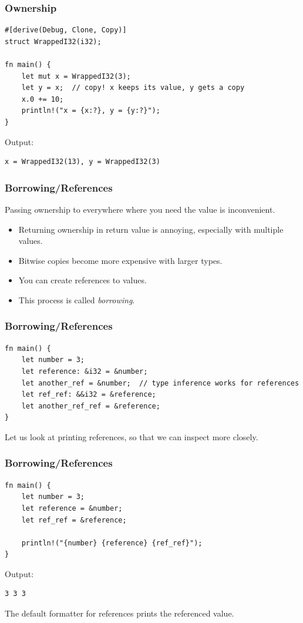 \begin{frame}[fragile]
    \frametitle{Ownership}
    \begin{verbatim}
#[derive(Debug, Clone, Copy)]
struct WrappedI32(i32);

fn main() {
    let mut x = WrappedI32(3);
    let y = x;  // copy! x keeps its value, y gets a copy
    x.0 += 10;
    println!("x = {x:?}, y = {y:?}");
}
    \end{verbatim}
    \pause
    \vfill
    Output:
    \begin{verbatim}
x = WrappedI32(13), y = WrappedI32(3)
    \end{verbatim}
\end{frame}

\begin{frame}[fragile]
    \frametitle{Borrowing/References}
    Passing ownership to everywhere where you need the value is inconvenient.
    \pause
    \begin{itemize}
        \item Returning ownership in return value is annoying, especially with multiple values.
        \item Bitwise copies become more expensive with larger types.
        \pause
        \vspace{.3cm}
        \item You can create references to values.
        \item This process is called \textit{borrowing}.
    \end{itemize}
\end{frame}

\begin{frame}[fragile]
    \frametitle{Borrowing/References}
    \begin{verbatim}
fn main() {
    let number = 3;
    let reference: &i32 = &number;
    let another_ref = &number;  // type inference works for references
    let ref_ref: &&i32 = &reference;
    let another_ref_ref = &reference;
}
    \end{verbatim}
    \pause
    \vfill
    Let us look at printing references, so that we can inspect more closely. 
\end{frame}

\begin{frame}[fragile]
    \frametitle{Borrowing/References}
    \begin{verbatim}
fn main() {
    let number = 3;
    let reference = &number;
    let ref_ref = &reference;

    println!("{number} {reference} {ref_ref}");
}
    \end{verbatim}
    \pause
    \vfill
    Output:
    \pause
    \begin{verbatim}
3 3 3
    \end{verbatim}
    \pause
    \vfill
    The default formatter for references prints the referenced value.
\end{frame}

